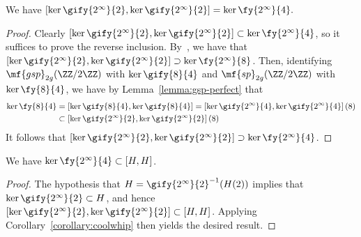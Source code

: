 \begin{corollary} \label{corollary:coolwhip} 
	We have
	\(
		[\ker \gify{2^\infty}{2}, \ker \gify{2^\infty}{2}] = \ker \fy{2^\infty}{4}.
	\)
\end{corollary} 
\begin{proof} 
Clearly \([\ker \gify{2^\infty}{2}, \ker \gify{2^\infty}{2}] \subset \ker \fy{2^\infty}{4}\), so it suffices to prove the reverse inclusion. By~\cite[Lemma 2.11]{landesman-swaminathan-tao-xu:rational-families}, we have that $[\ker \gify{2^\infty}{2}, \ker \gify{2^\infty}{2}] \supset \ker \fy{2^\infty}{8}$. Then, identifying $\mf{gsp}_{2g}(\ZZ/ 2 \ZZ)$ with $\ker \gify{8}{4}$ and $\mf{sp}_{2g}(\ZZ/2\ZZ)$ with $\ker \fy{8}{4}$, we have by Lemma~\ref{lemma:gsp-perfect} that
\begin{align*}
\ker \fy{8}{4} & = \left[ \ker \gify{8}{4},\ker \gify{8}{4} \right] = \left[ \ker \gify{2^\infty}{4},\ker \gify{2^\infty}{4} \right](8) \\
& \subset \left[ \ker \gify{2^\infty}{2},\ker \gify{2^\infty}{2} \right](8)
\end{align*}
It follows that $\left[ \ker \gify{2^\infty}{2},\ker \gify{2^\infty}{2} \right] \supset \ker \fy{2^\infty}{4}$.
\end{proof} 

\begin{corollary} \label{lemma:contains-mod-4}
	We have $\ker \fy{2^\infty}{4} \subset [H, H]$. 
\end{corollary}
\begin{proof} 
	The hypothesis that 
    \(
    	H = \gify{2^\infty}{2}^{-1}(H(2))
    \)
    implies that $\ker \gify{2^\infty}{2} \subset H$, and hence $[\ker \gify{2^\infty}{2}, \ker \gify{2^\infty}{2}] \subset [H, H]$. Applying Corollary~\ref{corollary:coolwhip} then yields the desired result.
\end{proof} 

